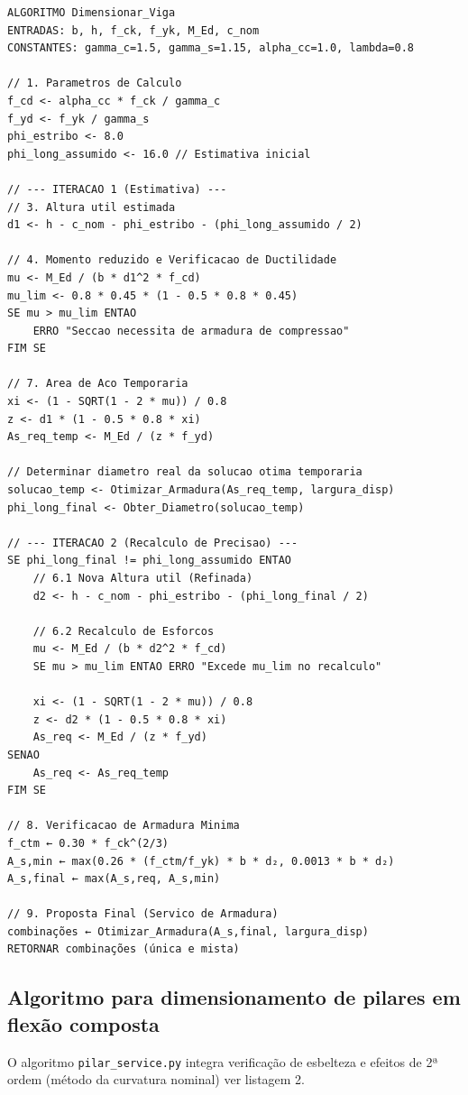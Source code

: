 \begin{lstlisting}[style=PseudoStyle, basicstyle=\ttfamily\normalsize, caption={Dimensionamento de uma viga à flexão simples (viga\_service.py)}, label={alg:viga}]
ALGORITMO Dimensionar_Viga
ENTRADAS: b, h, f_ck, f_yk, M_Ed, c_nom
CONSTANTES: gamma_c=1.5, gamma_s=1.15, alpha_cc=1.0, lambda=0.8

// 1. Parametros de Calculo
f_cd <- alpha_cc * f_ck / gamma_c
f_yd <- f_yk / gamma_s
phi_estribo <- 8.0
phi_long_assumido <- 16.0 // Estimativa inicial

// --- ITERACAO 1 (Estimativa) ---
// 3. Altura util estimada
d1 <- h - c_nom - phi_estribo - (phi_long_assumido / 2)

// 4. Momento reduzido e Verificacao de Ductilidade
mu <- M_Ed / (b * d1^2 * f_cd)
mu_lim <- 0.8 * 0.45 * (1 - 0.5 * 0.8 * 0.45)
SE mu > mu_lim ENTAO
    ERRO "Seccao necessita de armadura de compressao"
FIM SE

// 7. Area de Aco Temporaria
xi <- (1 - SQRT(1 - 2 * mu)) / 0.8
z <- d1 * (1 - 0.5 * 0.8 * xi)
As_req_temp <- M_Ed / (z * f_yd)

// Determinar diametro real da solucao otima temporaria
solucao_temp <- Otimizar_Armadura(As_req_temp, largura_disp)
phi_long_final <- Obter_Diametro(solucao_temp)

// --- ITERACAO 2 (Recalculo de Precisao) ---
SE phi_long_final != phi_long_assumido ENTAO
    // 6.1 Nova Altura util (Refinada)
    d2 <- h - c_nom - phi_estribo - (phi_long_final / 2)
    
    // 6.2 Recalculo de Esforcos
    mu <- M_Ed / (b * d2^2 * f_cd)
    SE mu > mu_lim ENTAO ERRO "Excede mu_lim no recalculo"
    
    xi <- (1 - SQRT(1 - 2 * mu)) / 0.8
    z <- d2 * (1 - 0.5 * 0.8 * xi)
    As_req <- M_Ed / (z * f_yd)
SENAO
    As_req <- As_req_temp
FIM SE

// 8. Verificacao de Armadura Minima
f_ctm ← 0.30 * f_ck^(2/3)
A_s,min ← max(0.26 * (f_ctm/f_yk) * b * d₂, 0.0013 * b * d₂)
A_s,final ← max(A_s,req, A_s,min)

// 9. Proposta Final (Servico de Armadura)
combinações ← Otimizar_Armadura(A_s,final, largura_disp)
RETORNAR combinações (única e mista)
\end{lstlisting}


\subsection{Algoritmo para dimensionamento de pilares em flexão composta}
O algoritmo \texttt{pilar\_service.py} integra verificação de esbelteza e efeitos de 2ª ordem (método da curvatura nominal) ver listagem 2.


